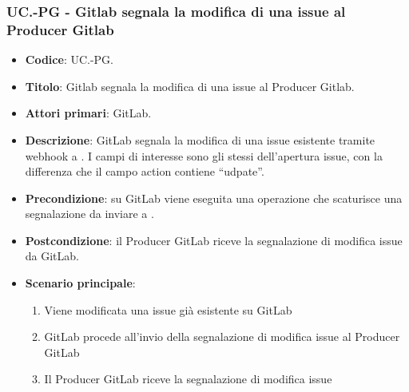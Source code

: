 
\subsubsection{UC\theuccount.\thesubuccount-PG - Gitlab segnala la modifica di una issue al Producer Gitlab}
\begin{itemize}
    \item \textbf{Codice}: UC\theuccount.\thesubuccount-PG.
    \item \textbf{Titolo}: Gitlab segnala la modifica di una issue al Producer Gitlab.
    \item \textbf{Attori primari}: GitLab.
    \item \textbf{Descrizione}: GitLab segnala la modifica di una issue esistente tramite webhook a
    \newline \progetto.
    I campi di interesse sono gli stessi dell'apertura issue, con la differenza che il campo action contiene ``udpate''.
    \item \textbf{Precondizione}: su GitLab viene eseguita una operazione che scaturisce una
    segnalazione da inviare a \progetto.
    \item \textbf{Postcondizione}: il Producer GitLab riceve la segnalazione di modifica issue da GitLab.
    \item \textbf{Scenario principale}:
    \begin{enumerate}
        \item Viene modificata una issue già esistente su GitLab
        \item GitLab procede all'invio della segnalazione di modifica issue al Producer GitLab
        \item Il Producer GitLab riceve la segnalazione di modifica issue
    \end{enumerate}

\end{itemize}


